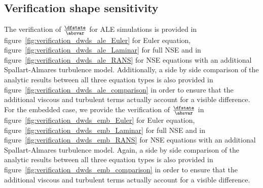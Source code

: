 \documentclass[../main.tex]{subfiles}
\begin{document}


\subsection{Verification shape sensitivity}
The verification of $\tfrac{\dfstate}{\absvar}$ for ALE simulations is provided in figure~\ref{fig:verification_dwds_ale_Euler} for Euler equation, figure~\ref{fig:verification_dwds_ale_Laminar} for full \ac{NSE} and in figure~\ref{fig:verification_dwds_ale_RANS} for \ac{NSE} equations with an additional Spallart-Almares turbulence model.
Additionally, a side by side comparison of the analytic results between all three equation types is also provided in figure~\ref{fig:verification_dwds_ale_comparison} in order to ensure that the additional viscous and turbulent terms actually account for a visible difference.
\\
For the embedded case, we provide the verification of $\tfrac{\dfstate}{\absvar}$  in figure~\ref{fig:verification_dwds_emb_Euler} for Euler equation, figure~\ref{fig:verification_dwds_emb_Laminar} for full \ac{NSE} and in figure~\ref{fig:verification_dwds_emb_RANS} for \ac{NSE} equations with an additional Spallart-Almares turbulence model.
Again, a side by side comparison of the analytic results between all three equation types is also provided in figure~\ref{fig:verification_dwds_emb_comparison} in order to ensure that the additional viscous and turbulent terms actually account for a visible difference.
\end{document}
